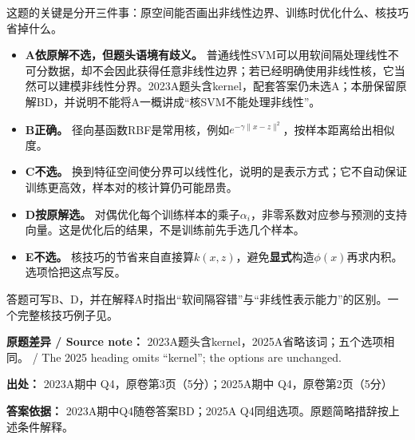 这题的关键是分开三件事：原空间能否画出非线性边界、训练时优化什么、核技巧省掉什么。



\begin{itemize}

\item \textbf{A依原解不选，但题头语境有歧义。} 普通线性SVM可以用软间隔处理线性不可分数据，却不会因此获得任意非线性边界；若已经明确使用非线性核，它当然可以建模非线性分界。2023A题头含kernel，配套答案仍未选A；本册保留原解BD，并说明不能将A一概讲成“核SVM不能处理非线性”。

\item \textbf{B正确。} 径向基函数RBF是常用核，例如\(e^{-\gamma\|x-z\|^2}\)，按样本距离给出相似度。

\item \textbf{C不选。} 换到特征空间使分界可以线性化，说明的是表示方式；它不自动保证训练更高效，样本对的核计算仍可能昂贵。

\item \textbf{D按原解选。} 对偶优化每个训练样本的乘子\(\alpha_i\)，非零系数对应参与预测的支持向量。这是优化后的结果，不是训练前先手选几个样本。

\item \textbf{E不选。} 核技巧的节省来自直接算\(k(x,z)\)，避免\textbf{显式}构造\(\phi(x)\)再求内积。选项恰把这点写反。

\end{itemize}


答题可写B、D，并在解释A时指出“软间隔容错”与“非线性表示能力”的区别。一个完整核技巧例子见。


\textbf{原题差异 / Source note：} 2023A题头含kernel，2025A省略该词；五个选项相同。 / The 2025 heading omits “kernel”; the options are unchanged.


\textbf{出处：} 2023A期中 Q4，原卷第3页（5分）；2025A期中 Q4，原卷第2页（5分）


\textbf{答案依据：} 2023A期中Q4随卷答案BD；2025A Q4同组选项。原题简略措辞按上述条件解释。
